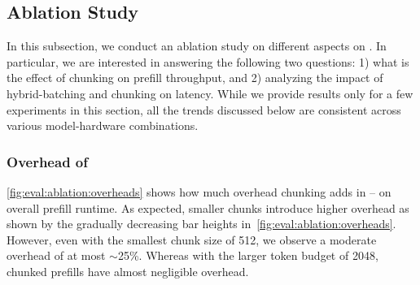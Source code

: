 \subsection{Ablation Study}
\label{sec-eval-ablation}


In this subsection, we conduct an ablation study on different aspects on \sysname. In particular, we are interested in answering the following two questions: 1) what is the effect of chunking on prefill throughput, and 2) analyzing the impact of hybrid-batching and chunking on latency. While we provide results only for a few experiments in this section, all the trends discussed below are consistent across various model-hardware combinations.

\subsubsection{Overhead of \chunking}
\label{sec-eval-ablation1}

\autoref{fig:eval:ablation:overheads} shows how much overhead chunking adds in \yi{} -- on overall prefill runtime. As expected, smaller chunks introduce higher overhead as shown by the gradually decreasing bar heights in~\autoref{fig:eval:ablation:overheads}. However, even with the smallest chunk size of 512, we observe a moderate overhead of at most $\sim$25\%. Whereas with the larger token budget of 2048, chunked prefills have almost negligible overhead. %










\begin{table}[t]
\centering
\setlength{\tabcolsep}{2pt}
\caption{TTFT and TBT latency measured in seconds for \dcoel and \chunking used in isolation as well as when they are used in tandem, evaluated over 128 requests for Yi-34B running on two A100s with a token budget of 1024. By using both \dcoel and \chunking, \sysname is able to lower both TTFT and TBT.}
\label{table:eval:attribution}
\end{table}


